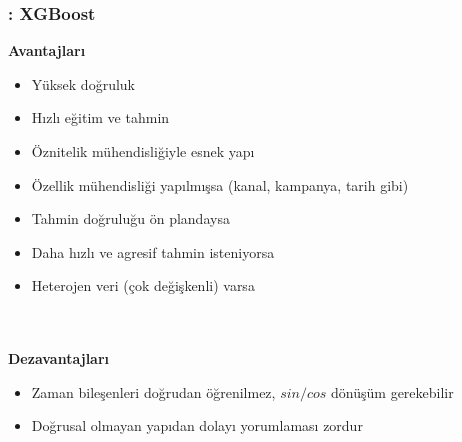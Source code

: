 \documentclass[12pt]{beamer}
\begin{document}
\begin{frame}
	\frametitle{\insertsection: XGBoost}
	\textbf{Avantajları}
	\begin{itemize}
		\item Yüksek doğruluk
		\item Hızlı eğitim ve tahmin
		\item Öznitelik mühendisliğiyle esnek yapı
		\item Özellik mühendisliği yapılmışsa (kanal, kampanya, tarih
		      gibi)
		\item Tahmin doğruluğu ön plandaysa
		\item Daha hızlı ve agresif tahmin isteniyorsa
		\item Heterojen veri (çok değişkenli) varsa
	\end{itemize} \\~\\

	\textbf{Dezavantajları}
	\begin{itemize}
		\item Zaman bileşenleri doğrudan öğrenilmez, $sin/cos$ dönüşüm
		      gerekebilir
		\item Doğrusal olmayan yapıdan dolayı yorumlaması zordur
	\end{itemize}
\end{frame}
\end{document}
